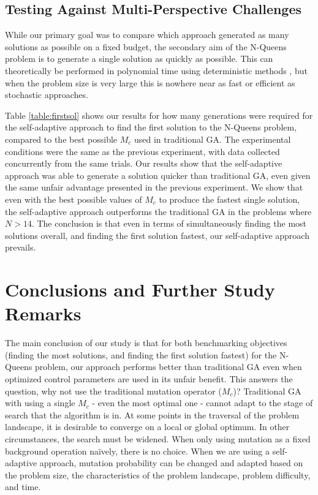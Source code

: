 \documentclass[conference]{IEEEtran}
\begin{document}





\subsection{Testing Against Multi-Perspective Challenges}
While our primary goal was to compare which approach generated as many solutions as possible on a fixed budget, the secondary aim of the N-Queens problem is to generate a single solution as quickly as possible. This can theoretically be performed in polynomial time using deterministic methods \cite{cit:22,cit:23}, but when the problem size is very large this is nowhere near as fast or efficient as stochastic approaches.

Table \ref{table:firstsol} shows our results for how many generations were required for the self-adaptive approach to find the first solution to the N-Queens problem, compared to the best possible $M_{c}$ used in traditional GA. The experimental conditions were the same as the previous experiment, with data collected concurrently from the same trials. Our results show that the self-adaptive approach was able to generate a solution quicker than traditional GA, even given the same unfair advantage presented in the previous experiment. We show that even with the best possible values of $M_{c}$ to produce the fastest single solution, the self-adaptive approach outperforms the traditional GA in the problems where $N > 14$. The conclusion is that even in terms of simultaneously finding the most solutions overall, and finding the first solution fastest, our self-adaptive approach prevails.

\section{Conclusions and Further Study Remarks}
The main conclusion of our study is that for both benchmarking objectives (finding the most solutions, and finding the first solution fastest) for the N-Queens problem, our approach performs better than traditional GA even when optimized control parameters are used in its unfair benefit. This answers the question, why not use the traditional mutation operator ($M_{c}$)? Traditional GA with using a single $M_{c}$ - even the most optimal one - cannot adapt to the stage of search that the algorithm is in. At some points in the traversal of the problem landscape, it is desirable to converge on a local or global optimum. In other circumstances, the search must be widened. When only using mutation as a fixed background operation na\"{i}vely, there is no choice. When we are using a self-adaptive approach, mutation probability can be changed and adapted based on the problem size, the characteristics of the problem landscape, problem difficulty, and time.
\end{document}
